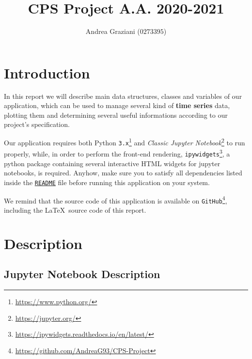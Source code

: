 \documentclass[sigconf]{acmart}
\begin{document}
\title{CPS Project A.A. 2020-2021}

\author{Andrea Graziani ($0273395$)}

\maketitle


\newcommand{\AndreaCodeLink}[2]{\textcolor{blue}{\href{#1}{\texttt{\underline{#2}}}}}
\newcommand{\abs}[1]{\left|#1\right|}
\newcommand{\mathDef}{\overset{\textit{def}}{=}}



\section{Introduction}

In this report we will describe main data structures, classes and variables of our application, which can be used to manage several kind of \textbf{time series} data, plotting them and determining several useful informations according to our project's specification. 

Our application requires both Python \texttt{3.x}\footnote{\url{https://www.python.org/}} and \textit{Classic Jupyter Notebook}\footnote{\url{https://jupyter.org/}} to run properly, while, in order to perform the front-end rendering, \texttt{ipywidgets}\footnote{\url{https://ipywidgets.readthedocs.io/en/latest/}}, a python package containing several interactive HTML widgets for jupyter notebooks, is required. Anyhow, make sure you to satisfy all dependencies listed inside the \AndreaCodeLink{https://github.com/AndreaG93/CPS-Project/blob/main/README.md}{README} file before running this application on your system.

We remind that the source code of this application is available on \texttt{GitHub}\footnote{\url{https://github.com/AndreaG93/CPS-Project}}, including the \LaTeX\ source code of this report.

\section{Description}

\subsection{Jupyter Notebook Description}
\end{document}
